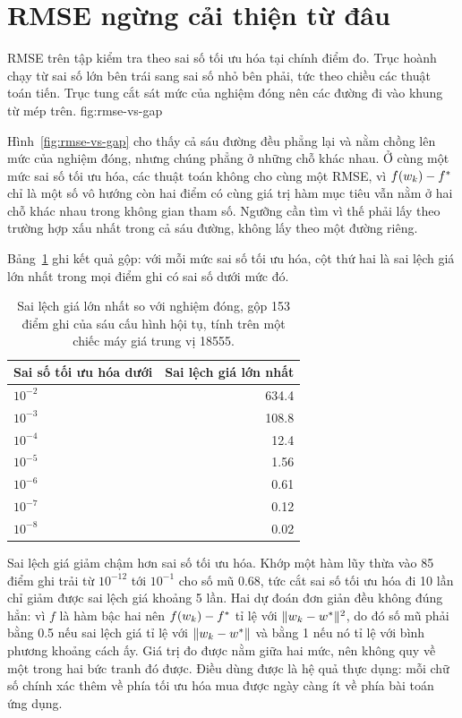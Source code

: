 \section{RMSE ngừng cải thiện từ đâu}
\label{sec:enough-curve}

  {RMSE trên tập kiểm tra theo sai số tối ưu hóa tại chính điểm đo. Trục hoành
   chạy từ sai số lớn bên trái sang sai số nhỏ bên phải, tức theo chiều các
   thuật toán tiến. Trục tung cắt sát mức của nghiệm đóng nên các đường đi vào
   khung từ mép trên.}
  {fig:rmse-vs-gap}

Hình~\ref{fig:rmse-vs-gap} cho thấy cả sáu đường đều phẳng lại và nằm chồng lên
mức của nghiệm đóng, nhưng chúng phẳng ở những chỗ khác nhau. Ở cùng một mức sai
số tối ưu hóa, các thuật toán không cho cùng một RMSE, vì $f(w_k) - f^{*}$ chỉ
là một số vô hướng còn hai điểm có cùng giá trị hàm mục tiêu vẫn nằm ở hai chỗ
khác nhau trong không gian tham số. Ngưỡng cần tìm vì thế phải lấy theo trường
hợp xấu nhất trong cả sáu đường, không lấy theo một đường riêng.

Bảng~\ref{tab:app-threshold} ghi kết quả gộp: với mỗi mức sai số tối ưu hóa, cột
thứ hai là sai lệch giá lớn nhất trong mọi điểm ghi có sai số dưới mức đó.

\begin{table}[tp]
  \centering
  \caption{Sai lệch giá lớn nhất so với nghiệm đóng, gộp 153 điểm ghi của sáu
    cấu hình hội tụ, tính trên một chiếc máy giá trung vị \num{18555}.}
  \label{tab:app-threshold}
  \begin{tabular}{lr}
    \toprule
    Sai số tối ưu hóa dưới & Sai lệch giá lớn nhất \\
    \midrule
    $10^{-2}$ & \num{634.4} \\
    $10^{-3}$ & \num{108.8} \\
    $10^{-4}$ & \num{12.4}  \\
    $10^{-5}$ & \num{1.56}  \\
    $10^{-6}$ & \num{0.61}  \\
    $10^{-7}$ & \num{0.12}  \\
    $10^{-8}$ & \num{0.02}  \\
    \bottomrule
  \end{tabular}
\end{table}

Sai lệch giá giảm chậm hơn sai số tối ưu hóa. Khớp một hàm lũy thừa vào 85 điểm
ghi trải từ $10^{-12}$ tới $10^{-1}$ cho số mũ \num{0.68}, tức cắt sai số tối ưu
hóa đi 10 lần chỉ giảm được sai lệch giá khoảng 5 lần. Hai dự đoán đơn giản đều
không đúng hẳn: vì $f$ là hàm bậc hai nên $f(w_k) - f^{*}$ tỉ lệ với
$\lVert w_k - w^{*}\rVert^{2}$, do đó số mũ phải bằng \num{0.5} nếu sai lệch giá tỉ lệ
với $\lVert w_k - w^{*}\rVert$ và bằng 1 nếu nó tỉ lệ với bình phương khoảng cách ấy.
Giá trị đo được nằm giữa hai mức, nên không quy về một trong hai bức tranh đó
được. Điều dùng được là hệ quả thực dụng: mỗi chữ số chính xác thêm về phía tối
ưu hóa mua được ngày càng ít về phía bài toán ứng dụng.

